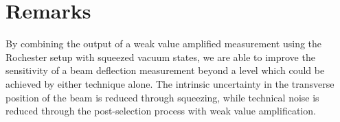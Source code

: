 %
%
%
\section{Remarks}
By combining the output of a weak value amplified measurement using the Rochester setup with squeezed vacuum states, we are able to improve the sensitivity of a beam deflection measurement beyond a level which could be achieved by either technique alone.  The intrinsic uncertainty in the transverse position of the beam is reduced through squeezing, while technical noise is reduced through the post-selection process with weak value amplification.

